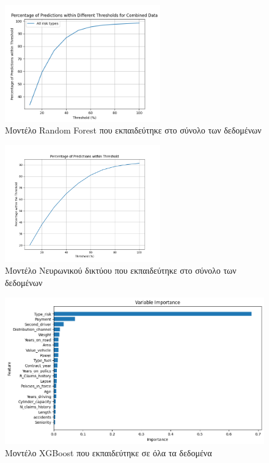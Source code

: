 \documentclass{llncs}
\begin{document}
\begin{figure}
    \begin{center}
        \includegraphics[width=0.6\textwidth]{images/combined_trained_all_thresholds_random_forest.png}
    \end{center}
    \caption{Μοντέλο Random Forest που εκπαιδεύτηκε στο σύνολο των δεδομένων}  
    \label{fig:random_forest_result}  
\end{figure}

\begin{figure}
    \begin{center}
        \includegraphics[width=0.6\textwidth]{images/neural_network_all_thresholds.png}
    \end{center}
    \caption{Μοντέλο Νευρωνικού δικτύου που εκπαιδεύτηκε στο σύνολο των δεδομένων}  
    \label{fig:neural_result}  
\end{figure}

\begin{figure}
    \begin{center}
        \includegraphics[width=1\textwidth]{images/feature_importance_combined_xgb.png}
    \end{center}
    \caption{Μοντέλο XGBoost που εκπαιδεύτηκε σε όλα τα δεδομένα}  
    \label{fig:XGBoost_all_feature_importance}  
\end{figure}
\end{document}
